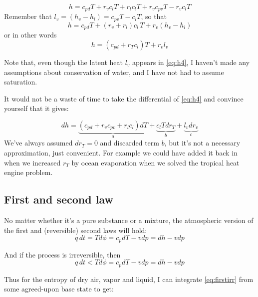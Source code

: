 \documentclass[12pt]{article}
\begin{document}
\begin{equation}
  \label{eq:h2}
  h = c_{pd} T + r_v c_l T + r_l c_l T + r_v c_{pv} T -  r_v c_l T 
\end{equation}
Remember that $l_v= (h_v - h_l) = c_{pv} T -   c_l T$, so that 
\begin{equation}
  \label{eq:h3}
  h = c_{pd} T + (r_v   + r_l )c_l\, T  + r_v(h_v - h_l)
\end{equation}
or in other words
\begin{equation}
  \label{eq:h4}
  h   = (c_{pd}  + r_T c_l) T + r_v l_v
\end{equation}


Note that, even though the latent heat $l_v$ appears in \eqref{eq:h4}, I haven't
made any assumptions about conservation of water, and I have not had to
assume saturation.  

It would not be a waste of time to take the
differential of \eqref{eq:h4} and convince yourself that it gives:


\begin{equation}
  \label{eq:h4diff}
  dh = \underbrace{(c_{pd} + r_v c_{pv} + r_l c_l ) dT}_a + 
  \underbrace{c_l T d r_T}_b + \underbrace{l_v d r_v}_c
\end{equation}
We've always assumed $dr_T = 0$ and discarded term $b$, but it's not a
necessary approximation, just convenient.  For example we could have added it
back in when we increased $r_T$ by 
ocean evaporation when we solved the  tropical heat engine problem.

\subsection{First and second law}
\label{sec:first-second-law}

No matter whether it's a pure substance or a mixture, the atmospheric version of the first
and (reversible) second laws will hold:  
\begin{equation}
  \label{eq:first}
 q\,dt = T d\phi = c_p dT - v dp = dh - v dp
\end{equation}


And if the process is irreversible, then
\begin{equation}
  \label{eq:firstirr}
 q\,dt < T d\phi = c_p dT - v dp = dh - v dp
\end{equation}



Thus for the entropy of dry air, vapor and liquid, I can integrate
\eqref{eq:firstirr} from some agreed-upon base state to get:
\end{document}

